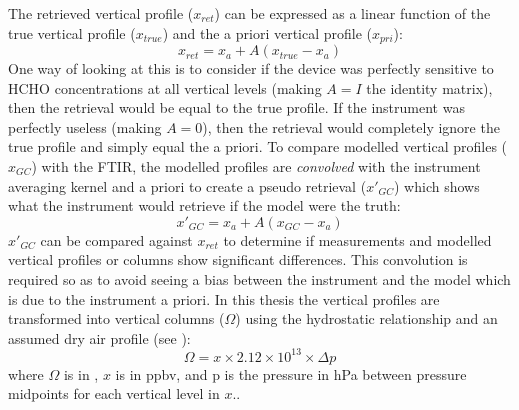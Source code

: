       
      
      
      The retrieved vertical profile ($x_{ret}$) can be expressed as a linear function of the true vertical profile ($x_{true}$) and the a priori vertical profile ($x_{pri}$):
      \begin{equation}
        x_{ret} = x_{a} + A \left( x_{true} - x_{a} \right)
      \end{equation}
      One way of looking at this is to consider if the device was perfectly sensitive to HCHO concentrations at all vertical levels (making $A=I$ the identity matrix), then the retrieval would be equal to the true profile.
      If the instrument was perfectly useless (making $A=0$), then the retrieval would completely ignore the true profile and simply equal the a priori.
      To compare modelled vertical profiles ($x_{GC}$) with the FTIR, the modelled profiles are \textit{convolved} with the instrument averaging kernel and a priori to create a pseudo retrieval ($x'_{GC}$) which shows what the instrument would retrieve if the model were the truth:
      \begin{equation}
        x'_{GC} = x_{a} + A \left( x_{GC} - x_{a} \right)
      \end{equation}
      $x'_{GC}$ can be compared against $x_{ret}$ to determine if measurements and modelled vertical profiles or columns show significant differences.
      This convolution is required so as to avoid seeing a bias between the instrument and the model which is due to the instrument a priori.
      In this thesis the vertical profiles are transformed into vertical columns ($\Omega$) using the hydrostatic relationship and an assumed dry air profile (see \textcite{Deeter2002}):
      \begin{equation}
        \Omega = x \times 2.12 \times 10^{13} \times \Delta p
      \end{equation}
      where $\Omega$ is in \moleccm, $x$ is in ppbv, and p is the pressure in hPa between pressure midpoints for each vertical level in $x$..
      
